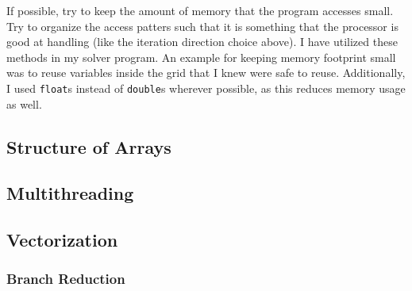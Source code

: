 If possible, try to keep the amount of memory that the program accesses small. Try to organize the access patters such that it is
something that the processor is good at handling (like the iteration direction choice above). I have utilized these methods in my
solver program. An example for keeping memory footprint small was to reuse variables inside the grid that I knew were safe to reuse.
Additionally, I used \texttt{float}s instead of \texttt{double}s wherever possible, as this reduces memory usage as well.

\subsection{Structure of Arrays}

\subsection{Multithreading}

\subsection{Vectorization}
\subsubsection{Branch Reduction}




